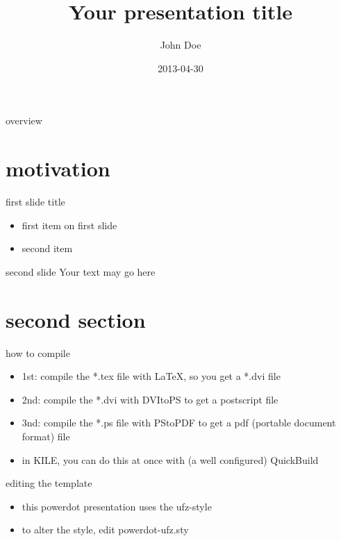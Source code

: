 \documentclass[style=ufz]{powerdot}
\title{Your presentation title}
\author{John Doe}
\date{2013-04-30}
\begin{document}
\maketitle

\begin{slide}{overview}
\tableofcontents[content=sections]
\end{slide}

\section{motivation}
\begin{slide}{first slide title}
\begin{itemize}
 \item first item on first slide\pause
 \item second item
\end{itemize}
\end{slide}

\begin{slide}{second slide}
Your text may go here
\end{slide}

\section{second section}

\begin{slide}{how to compile}
\begin{itemize}
 \item 1st: compile the *.tex file with LaTeX, so you get a *.dvi file\pause\newline
 \item 2nd: compile the *.dvi with DVItoPS to get a postscript file\pause\newline
 \item 3nd: compile the *.ps file with PStoPDF to get a pdf (portable document format) file\pause\newline
 \item in KILE, you can do this at once with (a well configured) QuickBuild
\end{itemize}
\end{slide}
\begin{slide}{editing the template}
\begin{itemize}
 \item this powerdot presentation uses the ufz-style\pause\newline
 \item to alter the style, edit powerdot-ufz.sty
\end{itemize}
\end{slide}
\end{document}
